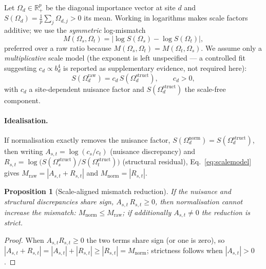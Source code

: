 \documentclass[conference]{IEEEtran}
\newtheorem{proposition}{Proposition}
\begin{document}
Let $\Omega_d\in\mathbb{R}_{+}^{p}$ be the diagonal importance vector at site $d$
and $S(\Omega_d)=\tfrac1p\sum_j\Omega_{d,j}>0$ its mean. Working in logarithms
makes scale factors additive; we use the \emph{symmetric} log-mismatch
\begin{equation}
M(\Omega_s,\Omega_t)=\bigl|\log S(\Omega_s)-\log S(\Omega_t)\bigr|,
\label{eq:logmismatch}
\end{equation}
preferred over a raw ratio because $M(\Omega_s,\Omega_t)=M(\Omega_t,\Omega_s)$.
We assume only a \emph{multiplicative} scale model (the exponent is left
unspecified --- a controlled fit suggesting $c_d\propto b_d^{4}$ is reported as
supplementary evidence, not required here):
\begin{equation}
S(\Omega_d^{\mathrm{raw}})=c_d\,S(\Omega_d^{\mathrm{struct}}),\qquad c_d>0,
\label{eq:scalemodel}
\end{equation}
with $c_d$ a site-dependent nuisance factor and $S(\Omega_d^{\mathrm{struct}})$ the
scale-free component.

\paragraph{Idealisation.} If normalisation exactly removes the nuisance factor,
$S(\Omega_d^{\mathrm{norm}})=S(\Omega_d^{\mathrm{struct}})$, then writing
$A_{s,t}=\log(c_s/c_t)$ (nuisance discrepancy) and
$R_{s,t}=\log\!\bigl(S(\Omega_s^{\mathrm{struct}})/S(\Omega_t^{\mathrm{struct}})\bigr)$
(structural residual), Eq.~\eqref{eq:scalemodel} gives
$M_{\mathrm{raw}}=|A_{s,t}+R_{s,t}|$ and $M_{\mathrm{norm}}=|R_{s,t}|$.

\begin{proposition}[Scale-aligned mismatch reduction]
\label{prop:scale}
If the nuisance and structural discrepancies share sign,
$A_{s,t}\,R_{s,t}\ge 0$, then normalisation cannot increase the mismatch:
$M_{\mathrm{norm}}\le M_{\mathrm{raw}}$; if additionally $A_{s,t}\neq 0$ the
reduction is strict.
\end{proposition}
\begin{proof}
When $A_{s,t}R_{s,t}\ge 0$ the two terms share sign (or one is zero), so
$|A_{s,t}+R_{s,t}|=|A_{s,t}|+|R_{s,t}|\ge|R_{s,t}|=M_{\mathrm{norm}}$; strictness
follows when $|A_{s,t}|>0$.
\end{proof}
\end{document}
